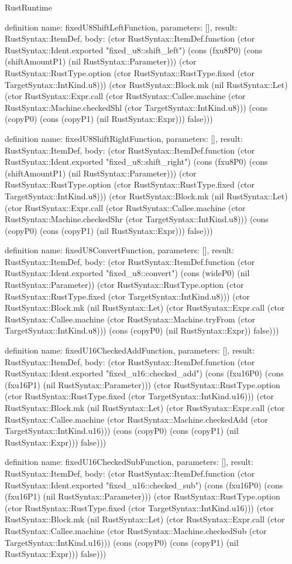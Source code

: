\begin{lexlean}{RustRuntime}
\begin{semanticmodule}
definition{
  name: fixedU8ShiftLeftFunction,
  parameters: [],
  result: RustSyntax::ItemDef,
  body: (ctor RustSyntax::ItemDef.function (ctor RustSyntax::Ident.exported "fixed_u8::shift_left") (cons (fxu8P0) (cons (shiftAmountP1) (nil RustSyntax::Parameter))) (ctor RustSyntax::RustType.option (ctor RustSyntax::RustType.fixed (ctor TargetSyntax::IntKind.u8))) (ctor RustSyntax::Block.mk (nil RustSyntax::Let) (ctor RustSyntax::Expr.call (ctor RustSyntax::Callee.machine (ctor RustSyntax::Machine.checkedShl (ctor TargetSyntax::IntKind.u8))) (cons (copyP0) (cons (copyP1) (nil RustSyntax::Expr))) false)))
}

definition{
  name: fixedU8ShiftRightFunction,
  parameters: [],
  result: RustSyntax::ItemDef,
  body: (ctor RustSyntax::ItemDef.function (ctor RustSyntax::Ident.exported "fixed_u8::shift_right") (cons (fxu8P0) (cons (shiftAmountP1) (nil RustSyntax::Parameter))) (ctor RustSyntax::RustType.option (ctor RustSyntax::RustType.fixed (ctor TargetSyntax::IntKind.u8))) (ctor RustSyntax::Block.mk (nil RustSyntax::Let) (ctor RustSyntax::Expr.call (ctor RustSyntax::Callee.machine (ctor RustSyntax::Machine.checkedShr (ctor TargetSyntax::IntKind.u8))) (cons (copyP0) (cons (copyP1) (nil RustSyntax::Expr))) false)))
}

definition{
  name: fixedU8ConvertFunction,
  parameters: [],
  result: RustSyntax::ItemDef,
  body: (ctor RustSyntax::ItemDef.function (ctor RustSyntax::Ident.exported "fixed_u8::convert") (cons (wideP0) (nil RustSyntax::Parameter)) (ctor RustSyntax::RustType.option (ctor RustSyntax::RustType.fixed (ctor TargetSyntax::IntKind.u8))) (ctor RustSyntax::Block.mk (nil RustSyntax::Let) (ctor RustSyntax::Expr.call (ctor RustSyntax::Callee.machine (ctor RustSyntax::Machine.tryFrom (ctor TargetSyntax::IntKind.u8))) (cons (copyP0) (nil RustSyntax::Expr)) false)))
}

definition{
  name: fixedU16CheckedAddFunction,
  parameters: [],
  result: RustSyntax::ItemDef,
  body: (ctor RustSyntax::ItemDef.function (ctor RustSyntax::Ident.exported "fixed_u16::checked_add") (cons (fxu16P0) (cons (fxu16P1) (nil RustSyntax::Parameter))) (ctor RustSyntax::RustType.option (ctor RustSyntax::RustType.fixed (ctor TargetSyntax::IntKind.u16))) (ctor RustSyntax::Block.mk (nil RustSyntax::Let) (ctor RustSyntax::Expr.call (ctor RustSyntax::Callee.machine (ctor RustSyntax::Machine.checkedAdd (ctor TargetSyntax::IntKind.u16))) (cons (copyP0) (cons (copyP1) (nil RustSyntax::Expr))) false)))
}

definition{
  name: fixedU16CheckedSubFunction,
  parameters: [],
  result: RustSyntax::ItemDef,
  body: (ctor RustSyntax::ItemDef.function (ctor RustSyntax::Ident.exported "fixed_u16::checked_sub") (cons (fxu16P0) (cons (fxu16P1) (nil RustSyntax::Parameter))) (ctor RustSyntax::RustType.option (ctor RustSyntax::RustType.fixed (ctor TargetSyntax::IntKind.u16))) (ctor RustSyntax::Block.mk (nil RustSyntax::Let) (ctor RustSyntax::Expr.call (ctor RustSyntax::Callee.machine (ctor RustSyntax::Machine.checkedSub (ctor TargetSyntax::IntKind.u16))) (cons (copyP0) (cons (copyP1) (nil RustSyntax::Expr))) false)))
}


\end{semanticmodule}
\end{lexlean}
